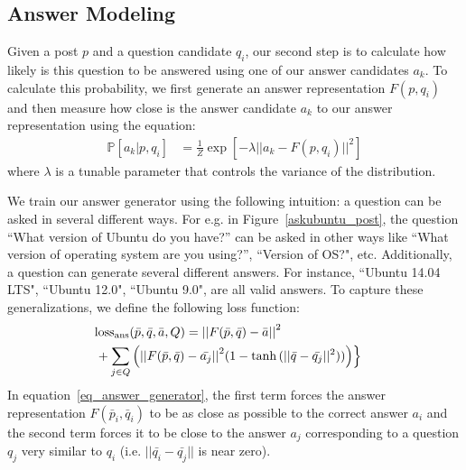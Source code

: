 \documentclass[11pt,a4paper]{article}
\begin{document}
\subsection{Answer Modeling}\label{answer_modeling}

Given a post $p$ and a question candidate $q_i$, our second step is to calculate how likely is this question to be answered using one of our answer candidates $a_k$. To calculate this probability, we first generate an answer representation $F(p,q_i)$ and then measure how close is the answer candidate $a_k$ to our answer representation using the equation:
\begin{align}
\mathbb{P}[a_k |p,q_i]  
&= \frac 1 Z \exp\left[- \lambda || a_k  -  F(p,q_i) ||^2\right]
\end{align}
where $\lambda$ is a tunable parameter that controls the variance of the distribution. 

We train our answer generator using the following intuition: a question can be asked in several different ways. For e.g. in Figure~\ref{askubuntu_post}, the question ``\textsf{\small What version of Ubuntu do you have?}'' can be asked in other ways like ``\textsf{\small What version of operating system are you using?}'', ``\textsf{\small Version of OS?}", etc.  
Additionally, a question can generate several different answers. For instance, ``\textsf{\small Ubuntu 14.04 LTS}", ``\textsf{\small Ubuntu 12.0}", ``\textsf{\small Ubuntu 9.0}", are all valid answers. To capture these generalizations, we define the following loss function:
%
%
\begin{align}\label{eq_answer_generator}
\textrm{loss}_{\textrm{ans}}(\bar p, \bar q, \bar a, Q) 
&=  {|| F(\bar p, \bar q) - \bar a||}^2 & \\
&\hspace{-25mm} +  \sum_{j \in Q} \Big ( {|| F(\bar p, \bar q) - \bar{a_j} ||}^2  (1 - \tanh{(|| \bar q - \bar{q_j} ||^2)}) \Big ) \Big \} &\nonumber
\end{align}
%
 In equation~\ref{eq_answer_generator}, the first term forces the answer representation $F(\bar p_i, \bar q_i)$ to be as close as possible to the correct answer $a_i$ and the second term forces it to be close to the answer $a_j$ corresponding to a question $q_j$ very similar to $q_i$ (i.e. $||\bar{q_i} - \bar{q_j}||$ is near zero).
\end{document}
